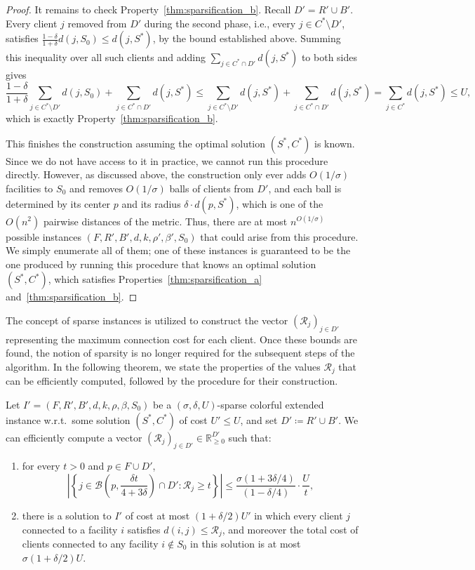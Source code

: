 \documentclass[a4paper,11pt]{article}
\newcommand{\real}{\mathbb{R}}
\begin{document}
\begin{proof}
It remains to check Property~\ref{thm:sparsification_b}. Recall $D' =
R' \cup B'$. Every client $j$ removed from $D'$ during the second
phase, i.e., every $j \in C^*\setminus D'$, satisfies
$\frac{1-\delta}{1+\delta}d(j,S_0) \le d(j,S^*)$, by the bound
established above. Summing this inequality over all such clients and
adding $\sum_{j\in C^*\cap D'} d(j,S^*)$ to both sides gives
\[
\frac{1-\delta}{1+\delta}\sum_{j\in C^*\setminus D'} d(j,S_0) +
\sum_{j\in C^*\cap D'} d(j,S^*) \le \sum_{j\in C^*\setminus D'} d(j,S^*)
+ \sum_{j\in C^*\cap D'} d(j,S^*) = \sum_{j\in
C^*} d(j,S^*) \le U,
\]
which is exactly Property~\ref{thm:sparsification_b}.

This finishes the construction assuming the optimal solution
$(S^*,C^*)$ is known. Since we do not have access to it in practice, we
cannot run this procedure directly. However, as discussed above, the
construction only ever adds $O(1/\sigma)$ facilities to $S_0$ and
removes $O(1/\sigma)$ balls of clients from $D'$, and each ball is
determined by its center $p$ and its radius $\delta \cdot d(p,S^*)$,
which is one of the $O(n^2)$ pairwise distances of the metric. Thus,
there are at most $n^{O(1/\sigma)}$ possible instances $(F,R',B',d,k,
\rho',\beta',S_0)$ that could arise from this procedure. We simply
enumerate all of them; one of these instances is guaranteed to be the
one produced by running this procedure that knows an optimal solution
$(S^*,C^*)$, which satisfies Properties~\ref{thm:sparsification_a}
and~\ref{thm:sparsification_b}.
\end{proof}

The concept of sparse instances is utilized to construct the vector $(\mathcal{R}_j)_{j \in D'}$ representing the maximum connection cost for each client. Once these bounds are found, the notion of sparsity is no longer required for the subsequent steps of the algorithm. In the following theorem, we state the properties of the values $\mathcal{R}_j$ that can be efficiently computed, followed by the procedure for their construction.

\begin{theorem}
\label{thm:radius}
Let $I' = (F, R', B', d, k, \rho, \beta, S_0)$ be a $(\sigma, \delta,
U)$-sparse colorful extended instance w.r.t.\ some solution $(S^*, C^*)$
of cost $U' \le U$, and set $D' \coloneqq R' \cup B'$. We can
efficiently compute a vector $(\mathcal{R}_j)_{j \in D'} \in \real^{D'}_{\ge 0}$
such that:
\begin{enumerate}
\item for every $t > 0$ and $p \in F \cup D'$,
\[ \left| \left\{ j \in \mathcal{B} \left( p, \frac{\delta t}{4 + 3\delta}
\right) \cap D' : \mathcal{R}_j \ge t \right\} \right| \le \frac{\sigma(1 +
3\delta/4)}{(1 - \delta/4)} \cdot \frac{U}{t}, \]
\item there is a solution to $I'$ of cost at most $(1+\delta/2)U'$ in
which every client $j$ connected to a facility $i$ satisfies $d(i,j) \le
\mathcal{R}_j$, and moreover the total cost of clients connected to any facility
$i \notin S_0$ in this solution is at most $\sigma(1+\delta/2)U$.
\end{enumerate}
\end{theorem}
\end{document}
